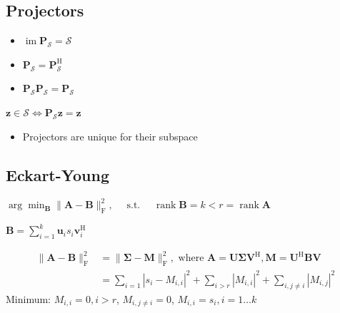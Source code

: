 \documentclass[english]{latex4ei/latex4ei_sheet}
\begin{document}
\begin{sectionbox}
  \subsection{Projectors}
  \begin{itemize}
    \item $\operatorname{im} \boldsymbol{P}_{\mathcal{S}}=\mathcal{S}$
    \item $\boldsymbol{P}_{\mathcal{S}}=\boldsymbol{P}_{\mathcal{S}}^{\mathrm{H}}$
    \item $\boldsymbol{P}_{\mathcal{S}} \boldsymbol{P}_{\mathcal{S}}=\boldsymbol{P}_{\mathcal{S}}$
  \end{itemize}
  \begin{emphbox}
    $\boldsymbol{z} \in \mathcal{S} \Longleftrightarrow  \boldsymbol{P}_{\mathcal{S}} \boldsymbol{z}=\boldsymbol{z}$
  \end{emphbox}
  \begin{itemize}
    \item Projectors are unique for their subspace
  \end{itemize}
\end{sectionbox}

\begin{sectionbox}
  \subsection{Eckart-Young}
  $\arg \min _{\boldsymbol{B}}\|\boldsymbol{A}-\boldsymbol{B}\|_{\mathrm{F}}^{2}, \quad \text { s.t. } \quad \operatorname{rank} \boldsymbol{B}=k<r=\operatorname{rank} \boldsymbol{A}$
  \vspace{-0.2cm}
  \begin{emphbox}
    $\boldsymbol{B}=\sum_{i=1}^{k} \boldsymbol{u}_{i} s_{i} \boldsymbol{v}_{i}^{\mathrm{H}}$
  \end{emphbox}
  $$\begin{aligned}\|\boldsymbol{A}-\boldsymbol{B}\|_{\mathrm{F}}^{2}&=\|\boldsymbol{\Sigma}-\boldsymbol{M}\|_{\mathrm{F}}^{2}, \text{ where } \boldsymbol{A}=\boldsymbol{U} \boldsymbol{\Sigma} \boldsymbol{V}^{\mathrm{H}},\boldsymbol{M}=\boldsymbol{U}^{\mathrm{H}} \boldsymbol{B} \boldsymbol{V}\\&=\sum_{i=1}\left|s_{i}-M_{i, i}\right|^{2}+\sum_{i>r}\left|M_{i, i}\right|^{2}+\sum_{i, j \neq i}\left|M_{i, j}\right|^{2}\end{aligned}$$
  Minimum: $M_{i,i} = 0, i>r$, $M_{i,j\neq i} = 0$, $M_{i,i} = s_i, i=1\dots k$
\end{sectionbox}
\end{document}
